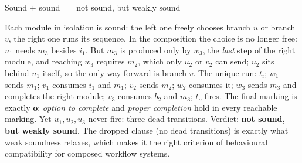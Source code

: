 \begin{examplebox}{Sound $+$ sound $=$ not sound, but weakly sound}
\begin{center}
\end{center}
Each module in isolation is sound: the left one freely chooses branch $u$ or branch $v$, the right one runs its sequence. In the composition the choice is no longer free: $u_1$ needs $m_3$ besides $i_1$. But $m_3$ is produced only by $w_3$, the \emph{last} step of the right module, and reaching $w_3$ requires $m_2$, which only $u_2$ or $v_2$ can send; $u_2$ sits behind $u_1$ itself, so the only way forward is branch $v$. The unique run: $t_i$; $w_1$ sends $m_1$; $v_1$ consumes $i_1$ and $m_1$; $v_2$ sends $m_2$; $w_2$ consumes it; $w_3$ sends $m_3$ and completes the right module; $v_3$ consumes $b_2$ and $m_3$; $t_o$ fires. The final marking is exactly $\mathbf{o}$: \emph{option to complete} and \emph{proper completion} hold in every reachable marking. Yet $u_1, u_2, u_3$ never fire: three dead transitions. Verdict: \textbf{not sound, but weakly sound}. The dropped clause (no dead transitions) is exactly what weak soundness relaxes, which makes it the right criterion of behavioural compatibility for composed workflow systems.
\end{examplebox}
